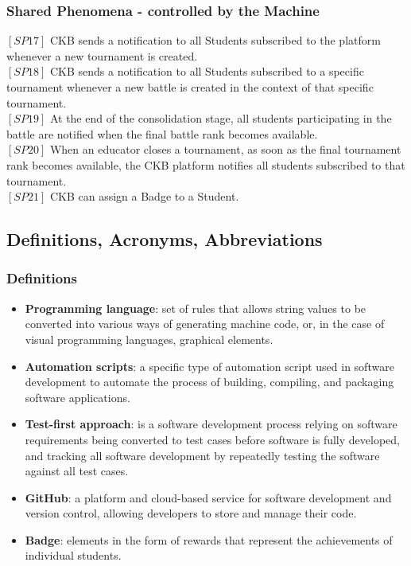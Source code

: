 \vspace{12pt}
 
\subsubsection{Shared Phenomena - controlled by the Machine}
$[SP17]$ CKB sends a notification to all Students subscribed to the platform whenever a new tournament is created. 
\\$[SP18]$ CKB sends a notification to all Students subscribed to a specific tournament whenever a new battle is created in the context of that specific tournament.
\\$[SP19]$ At the end of the consolidation stage, all students participating in the battle are notified when the final battle rank becomes available.
\\$[SP20]$ When an educator closes a tournament, as soon as the final tournament rank becomes available, the CKB platform notifies all students subscribed to that tournament.
\\$[SP21]$ CKB can assign a Badge to a Student.

\vspace{24pt}

\newpage

\subsection{Definitions, Acronyms, Abbreviations}

\vspace{24pt}

\subsubsection{Definitions}
\begin{itemize}
    \item \textbf{Programming language}: set of rules that allows string values to be converted into various ways of generating machine code, or, in the case of visual programming languages, graphical elements.
    \item \textbf{Automation scripts}: a specific type of automation script used in software development to automate the process of building, compiling, and packaging software applications.
    \item \textbf{Test-first approach}: is a software development process relying on software requirements being converted to test cases before software is fully developed, and tracking all software development by repeatedly testing the software against all test cases.
    \item \textbf{GitHub}: a platform and cloud-based service for software development and version control, allowing developers to store and manage their code.
    \item \textbf{Badge}: elements in the form of rewards that represent the achievements of individual students.
\end{itemize}


